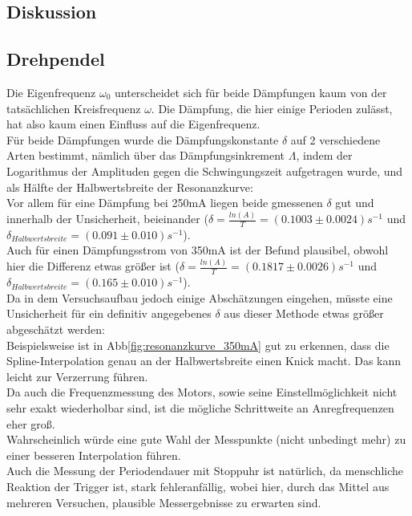 \documentclass[12pt,a4paper]{article}
\begin{document}
\begin{multicols}{2}


\pagebreak
\section{Diskussion}
\subsection{Drehpendel}
Die Eigenfrequenz $\omega_0$ unterscheidet sich für beide Dämpfungen kaum von der tatsächlichen Kreisfrequenz $\omega$. Die Dämpfung, die hier einige Perioden zulässt, hat also kaum einen Einfluss auf die Eigenfrequenz.\\

Für beide Dämpfungen wurde die Dämpfungskonstante $\delta$ auf 2 verschiedene Arten bestimmt, nämlich über das Dämpfungsinkrement $\Lambda$, indem der Logarithmus der Amplituden gegen die Schwingungszeit aufgetragen wurde, und als Hälfte der Halbwertsbreite der Resonanzkurve:\\
Vor allem für eine Dämpfung bei 250mA liegen beide gmessenen $\delta$ gut und innerhalb der Unsicherheit, beieinander ($\delta = \frac{ln(A)}{T} = (0.1003 \pm 0.0024)s^{-1}$ und $\delta_{Halbwertsbreite} = (0.091 \pm 0.010)s^{-1}$).\\
Auch für einen Dämpfungsstrom von 350mA ist der Befund plausibel, obwohl hier die Differenz etwas größer ist ($\delta = \frac{ln(A)}{T} = (0.1817 \pm 0.0026)s^{-1}$ und $\delta_{Halbwertsbreite} = (0.165 \pm 0.010)s^{-1}$).\\
Da in dem Versuchsaufbau jedoch einige Abschätzungen eingehen, müsste eine Unsicherheit für ein definitiv angegebenes $\delta$ aus dieser Methode etwas größer abgeschätzt werden:\\
Beispielsweise ist in Abb\ref{fig:resonanzkurve_350mA} gut zu erkennen, dass die Spline-Interpolation genau an der Halbwertsbreite einen Knick macht. Das kann leicht zur Verzerrung führen.\\
Da auch die Frequenzmessung des Motors, sowie seine Einstellmöglichkeit nicht sehr exakt wiederholbar sind, ist die mögliche Schrittweite an Anregfrequenzen eher groß.\\
Wahrscheinlich würde eine gute Wahl der Messpunkte (nicht unbedingt mehr) zu einer besseren Interpolation führen.\\

Auch die Messung der Periodendauer mit Stoppuhr ist natürlich, da menschliche Reaktion der Trigger ist, stark fehleranfällig, wobei hier, durch das Mittel aus mehreren Versuchen, plausible Messergebnisse zu erwarten sind.\\


\end{multicols}
\end{document}
